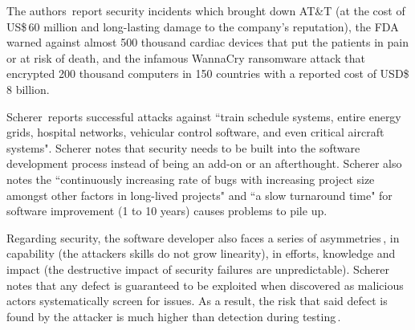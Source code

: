 \documentclass[nomenclature, english, bibtex]{kththesis}
\begin{document}

The authors\,\cite{moy_when_2020} report security incidents which brought down AT\&T (at the cost of US\$\,60 million and long-lasting damage to the company's reputation), the \gls{FDA} warned against almost 500 thousand cardiac devices that put the patients in pain or at risk of death, and the infamous WannaCry ransomware attack that encrypted 200 thousand computers in 150 countries with a reported cost of USD\$\,8 billion.

Scherer\,\cite{scherer_engineering_2021} reports successful attacks against ``train schedule systems, entire energy grids, hospital networks, vehicular control software, and even critical aircraft systems". Scherer notes that security needs to be built into the software development process instead of being an add-on or an afterthought. Scherer also notes the ``continuously increasing rate of bugs with increasing project size amongst other factors in long-lived projects" and ``a slow turnaround time" for software improvement (1 to 10 years) causes problems to pile up.

Regarding security, the software developer also faces a series of asymmetries\,\cite{chapman_adacore_2018}, in capability (the attackers skills do not grow linearity), in efforts, knowledge and impact (the destructive impact of security failures are unpredictable). Scherer notes that any defect is guaranteed to be exploited when discovered as malicious actors systematically screen for issues. As a result, the risk that said defect is found by the attacker is much higher than detection during testing\,\cite{scherer_engineering_2021}.
\end{document}
